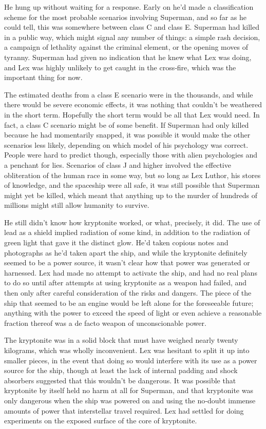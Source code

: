 \documentclass[ebook,12pt]{memoir}
\begin{document}
He hung up without waiting for a response. Early on he'd made a
classification scheme for the most probable scenarios involving
Superman, and so far as he could tell, this was somewhere between class
C and class E. Superman had killed in a public way, which might signal
any number of things: a simple rash decision, a campaign of lethality
against the criminal element, or the opening moves of tyranny. Superman
had given no indication that he knew what Lex was doing, and Lex was
highly unlikely to get caught in the cross‐fire, which was the important
thing for now.

The estimated deaths from a class E scenario were in the thousands, and
while there would be severe economic effects, it was nothing that
couldn't be weathered in the short term. Hopefully the short term would
be all that Lex would need. In fact, a class C scenario might be of some
benefit. If Superman had only killed because he had momentarily snapped,
it was possible it would make the other scenarios less likely, depending
on which model of his psychology was correct. People were hard to
predict though, especially those with alien psychologies and a penchant
for lies. Scenarios of class J and higher involved the effective
obliteration of the human race in some way, but so long as Lex Luthor,
his stores of knowledge, and the spaceship were all safe, it was still
possible that Superman might yet be killed, which meant that anything up
to the murder of hundreds of millions might still allow humanity to
survive.

He still didn't know how kryptonite worked, or what, precisely, it did.
The use of lead as a shield implied radiation of some kind, in addition
to the radiation of green light that gave it the distinct glow. He'd
taken copious notes and photographs as he'd taken apart the ship, and
while the kryptonite definitely seemed to be a power source, it wasn't
clear how that power was generated or harnessed. Lex had made no attempt
to activate the ship, and had no real plans to do so until after
attempts at using kryptonite as a weapon had failed, and then only after
careful consideration of the risks and dangers. The piece of the ship
that seemed to be an engine would be left alone for the foreseeable
future; anything with the power to exceed the speed of light or even
achieve a reasonable fraction thereof was a de facto weapon of
unconscionable power.

The kryptonite was in a solid block that must have weighed nearly twenty
kilograms, which was wholly inconvenient. Lex was hesitant to split it
up into smaller pieces, in the event that doing so would interfere with
its use as a power source for the ship, though at least the lack of
internal padding and shock absorbers suggested that this wouldn't be
dangerous. It was possible that kryptonite by itself held no harm at all
for Superman, and that kryptonite was only dangerous when the ship was
powered on and using the no‐doubt immense amounts of power that
interstellar travel required. Lex had settled for doing experiments on
the exposed surface of the core of kryptonite.
\end{document}
